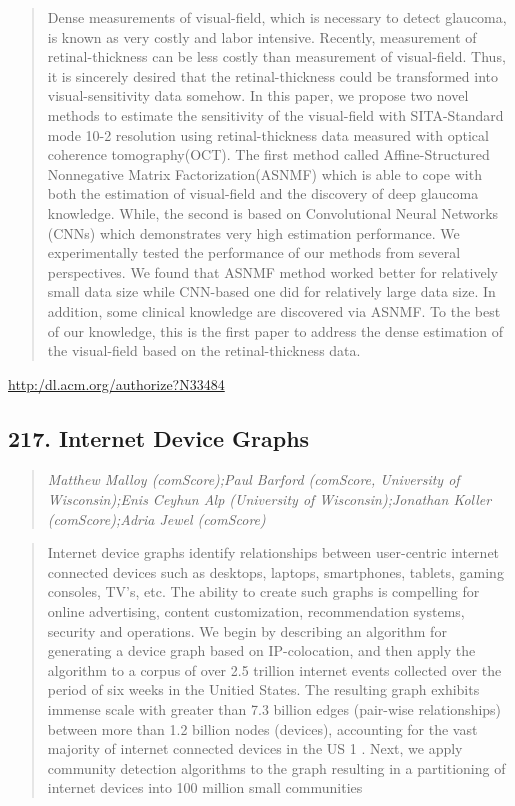 \documentclass{article}
\begin{document}
\begin{quote}
Dense measurements of visual-field, which is necessary to detect glaucoma, is known as very costly and labor intensive. Recently, measurement of retinal-thickness can be less costly than measurement of visual-field. Thus, it is sincerely desired that the retinal-thickness could be transformed into visual-sensitivity data somehow. In this paper, we propose two novel methods to estimate the sensitivity of the visual-field with SITA-Standard mode 10-2 resolution using retinal-thickness data measured with optical coherence tomography(OCT). The first method called Affine-Structured Nonnegative Matrix Factorization(ASNMF) which is able to cope with both the estimation of visual-field and the discovery of deep glaucoma knowledge. While, the second is based on Convolutional Neural Networks (CNNs) which demonstrates very high estimation performance. We experimentally tested the performance of our methods from several perspectives. We found that ASNMF method worked better for relatively small data size while CNN-based one did for relatively large data size. In addition, some clinical knowledge are discovered via ASNMF. To the best of our knowledge, this is the first paper to address the dense estimation of the visual-field based on the retinal-thickness data.
\end{quote}

\href{http:/dl.acm.org/authorize?N33484}{http:/dl.acm.org/authorize?N33484}

\subsection{217. Internet Device Graphs}

\begin{quote}
\footnotesize{\textit{Matthew Malloy (comScore);Paul Barford (comScore, University of Wisconsin);Enis Ceyhun Alp (University of Wisconsin);Jonathan Koller (comScore);Adria Jewel (comScore)}}

\end{quote}

\begin{quote}
Internet device graphs identify relationships between user-centric internet connected devices such as desktops, laptops, smartphones, tablets, gaming consoles, TV’s, etc. The ability to create such graphs is compelling for online advertising, content customization, recommendation systems, security and operations. We begin by describing an algorithm for generating a device graph based on IP-colocation, and then apply the algorithm to a corpus of over 2.5 trillion internet events collected over the period of six weeks in the Unitied States. The resulting graph exhibits immense scale with greater than 7.3 billion edges (pair-wise relationships) between more than 1.2 billion nodes (devices), accounting for the vast majority of internet connected devices in the US 1 . Next, we apply community detection algorithms to the graph resulting in a partitioning of internet devices into 100 million small communities
\end{quote}
\end{document}
